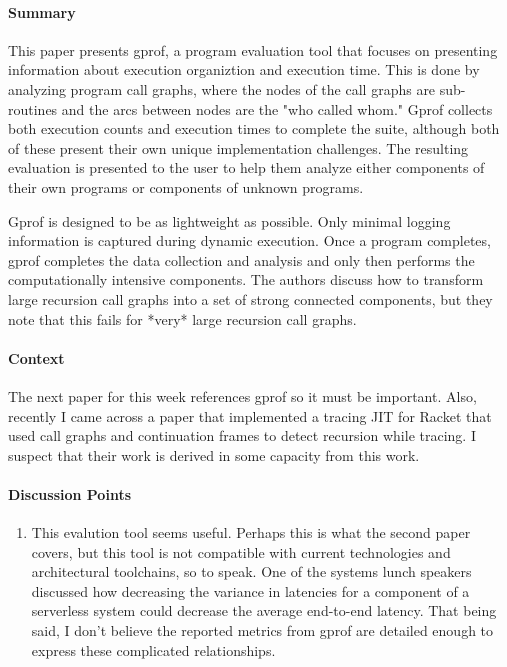 \paragraph{\textbf{Summary}}
This paper presents gprof, a program evaluation tool that focuses on presenting
information about execution organiztion and execution time. This is done by
analyzing program call graphs, where the nodes of the call graphs are
sub-routines and the arcs between nodes are the "who called whom." Gprof
collects both execution counts and execution times to complete the suite,
although both of these present their own unique implementation challenges. The
resulting evaluation is presented to the user to help them analyze either
components of their own programs or components of unknown programs.

Gprof is designed to be as lightweight as possible. Only minimal logging
information is captured during dynamic execution. Once a program completes,
gprof completes the data collection and analysis and only then performs the
computationally intensive components. The authors discuss how to transform
large recursion call graphs into a set of strong connected components, but they
note that this fails for *very* large recursion call graphs.

\paragraph{\textbf{Context}}
The next paper for this week references gprof so it must be important. Also,
recently I came across a paper that implemented a tracing JIT for Racket that
used call graphs and continuation frames to detect recursion while tracing. I
suspect that their work is derived in some capacity from this work.

\paragraph{\textbf{Discussion Points}}
\begin{enumerate}
    \item This evalution tool seems useful. Perhaps this is what the second
    paper covers, but this tool is not compatible with current technologies and
    architectural toolchains, so to speak. One of the systems lunch speakers
    discussed how decreasing the variance in latencies for a component of a
    serverless system could decrease the average end-to-end latency. That being
    said, I don't believe the reported metrics from gprof are detailed enough to
    express these complicated relationships.
\end{enumerate}


